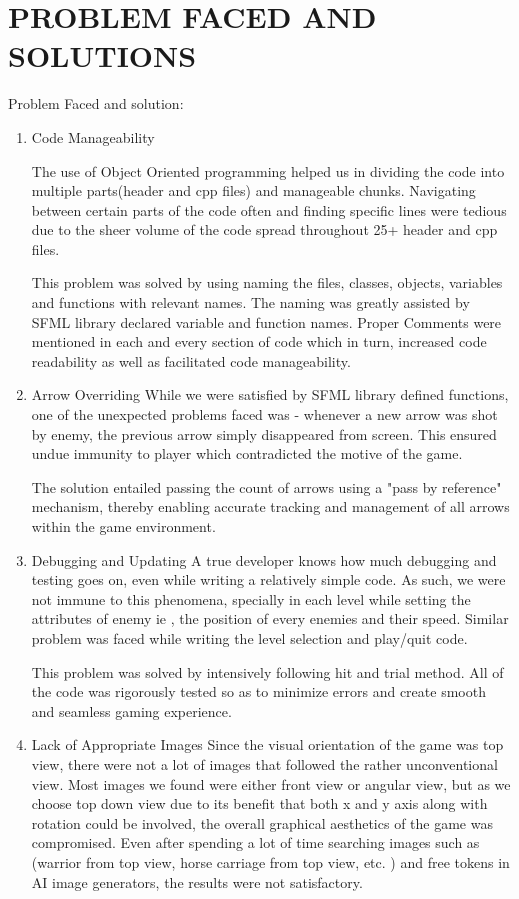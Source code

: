 \section{PROBLEM FACED AND SOLUTIONS}
Problem Faced and solution:

\begin{enumerate}
	\item Code Manageability
	
	The use of Object Oriented programming helped us in dividing the code into multiple parts(header and cpp files) and manageable chunks. Navigating between certain parts of the code often and finding specific lines were tedious due to the sheer volume of the code spread throughout 25+ header and cpp files.
	
	This problem was solved by using naming the files, classes, objects, variables and functions with relevant names. The naming was greatly assisted by SFML library declared variable and function names. Proper Comments were mentioned in each and every section of code which in turn, increased code readability as well as facilitated code manageability.
	
	
	\item  Arrow Overriding
	While we were satisfied by SFML library defined functions, one of the unexpected problems faced was - whenever a new arrow was shot by enemy, the previous arrow simply disappeared from screen. This ensured undue immunity to player which contradicted the motive of the game.
	
	The solution entailed passing the count of arrows using a "pass by reference" mechanism, thereby enabling accurate tracking and management of all arrows within the game environment.
		
	\item Debugging and Updating
	A true developer knows how much debugging and testing goes on, even while writing a relatively simple code. As such, we were not immune to this phenomena, specially in each level while setting the attributes of  enemy ie , the position of every enemies and their speed. Similar problem was faced while writing the level selection and play/quit code.
	
	This problem was solved by intensively following hit and trial method. All of the code was rigorously tested so as to minimize errors and create smooth and seamless gaming experience.
	
	\item Lack of Appropriate Images
	Since the visual orientation of the game was top view, there were not a lot of images that followed the rather unconventional view. Most images we found were either front view or angular view, but as we choose top down view due to its benefit that both x and y axis along with rotation could be involved, the overall graphical aesthetics of the game was compromised. Even after spending a lot of time searching images such as (warrior from top view, horse carriage from top view, etc. ) and free tokens in AI image generators, the results were not satisfactory.
	

\end{enumerate}
